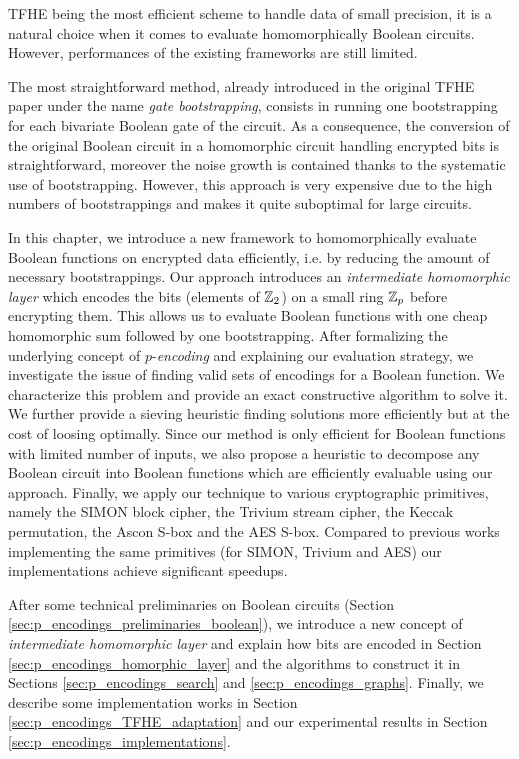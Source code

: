 

\gls{TFHE} being the most efficient scheme to handle data of small precision, it is a natural choice when it comes to evaluate homomorphically Boolean circuits. However, performances of the existing frameworks are still limited. 

The most straightforward method, already introduced in the original \gls{TFHE} paper \cite{JC:CGGI20} under the name \emph{gate bootstrapping}, consists in running one bootstrapping for each bivariate Boolean gate of the circuit. As a consequence, the conversion of the original Boolean circuit in a homomorphic circuit handling encrypted bits is straightforward, moreover the noise growth is contained thanks to the systematic use of bootstrapping. However, this approach is very expensive due to the high numbers of bootstrappings and makes it quite suboptimal for large circuits.


In this chapter, we introduce a new framework to homomorphically evaluate Boolean functions on encrypted data efficiently, i.e. by reducing the amount of necessary bootstrappings. Our approach introduces an \emph{intermediate homomorphic layer} which encodes the bits (elements of $\mathbb{Z}_2$) on a small ring $\mathbb{Z}_p$ before encrypting them. This allows us to evaluate Boolean functions with one cheap homomorphic sum followed by one bootstrapping. After formalizing the underlying concept of $p$-\emph{encoding} and explaining our evaluation strategy, we investigate the issue of finding valid sets of encodings for a Boolean function. We characterize this problem and provide an exact constructive algorithm to solve it. We further provide a sieving heuristic finding solutions more efficiently but at the cost of loosing optimally. Since our method is only efficient for Boolean functions with limited number of inputs, we also propose a heuristic to decompose any Boolean circuit into Boolean functions which are efficiently evaluable using our approach. Finally, we apply our technique to various cryptographic primitives, namely the SIMON block cipher, the Trivium stream cipher, the Keccak permutation, the Ascon \gls{S-box} and the \gls{AES} \gls{S-box}. Compared to previous works implementing the same primitives (for SIMON, Trivium and \gls{AES}) our implementations achieve significant speedups.

After some technical preliminaries on Boolean circuits (Section \ref{sec:p_encodings_preliminaries_boolean}), we introduce a new concept of \emph{intermediate homomorphic layer} and explain how bits are encoded  in Section \ref{sec:p_encodings_homorphic_layer} and the algorithms to construct it in Sections \ref{sec:p_encodings_search} and \ref{sec:p_encodings_graphs}. Finally, we describe some implementation works in Section \ref{sec:p_encodings_TFHE_adaptation} and our experimental results in Section \ref{sec:p_encodings_implementations}.










